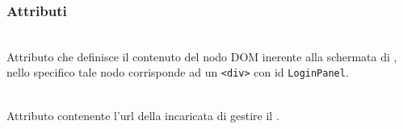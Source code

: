 \subsubsection*{Attributi}
\begin{description}

  \item{}\\
  Attributo che definisce il contenuto del nodo DOM inerente alla schermata di , nello specifico tale nodo corrisponde ad un \texttt{<div>} con id \texttt{LoginPanel}.
  \item{}\\
  Attributo contenente l'url della  incaricata di gestire il .

\end{description}

